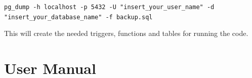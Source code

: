 \documentclass[a4paper, 11pt]{article}
\begin{document}
\texttt{pg\_dump -h localhost -p 5432 -U "insert\_your\_user\_name" -d "insert\_your\_database\_name" -f backup.sql }

This will create the needed triggers, functions and tables for running the code.

\newpage
\section{User Manual}

\newcommand\PUT{{\bfseries\color{Blue} PUT}}
\newcommand\POST{{\bfseries\color{BurntOrange} POST}}
\newcommand\GET{{\bfseries\color{Green} GET}}
\newcommand\DELETE{{\bfseries\color{Maroon} DELETE}}

\newcommand\requestpar[4]{
  \vspace{0.5em}
  \noindent
  {#1} \href{http://localhost:8080#2}{#2}\\{#3}
  \vspace{0.5em}
  \ifx\relax#4\relax\else
    \par\hfill\begin{minipage}{0.95\textwidth}
    {\texttt{#4}}
    \end{minipage} 
  \fi
  \par
  \vspace{1em}
}
\end{document}
